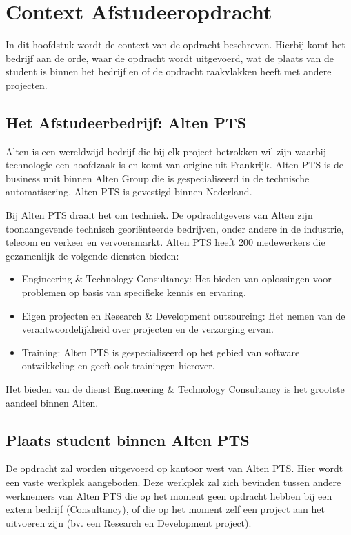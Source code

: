 \documentclass{../local}
\begin{document}
\section{Context Afstudeeropdracht}
In dit hoofdstuk wordt de context van de opdracht beschreven. Hierbij komt het bedrijf aan de orde, waar de opdracht wordt uitgevoerd, wat de plaats van de student is binnen het bedrijf en of de opdracht raakvlakken heeft met andere projecten. 

\subsection{Het Afstudeerbedrijf: Alten PTS}
Alten is een wereldwijd bedrijf die bij elk project betrokken wil zijn waarbij technologie een hoofdzaak is en komt van origine uit Frankrijk. Alten PTS is de business unit binnen Alten Group die is gespecialiseerd in de technische automatisering. Alten PTS is gevestigd binnen Nederland.

Bij Alten PTS draait het om techniek. De opdrachtgevers van Alten zijn toonaangevende technisch georiënteerde bedrijven, onder andere in de industrie, telecom en verkeer en vervoersmarkt. Alten PTS heeft 200 medewerkers die gezamenlijk de volgende diensten bieden:

\begin{itemize}

\item Engineering \& Technology Consultancy: Het bieden van oplossingen voor problemen op basis van specifieke kennis en ervaring.
\item Eigen projecten en Research \& Development outsourcing: Het nemen van de verantwoordelijkheid over projecten en de verzorging ervan.
\item Training: Alten PTS is gespecialiseerd op het gebied van software ontwikkeling en geeft ook trainingen hierover.

\end{itemize}

Het bieden van de dienst Engineering \& Technology Consultancy is het grootste aandeel binnen Alten.\cite{Alten}

\subsection{Plaats student binnen Alten PTS}
De opdracht zal worden uitgevoerd op kantoor west van Alten PTS. Hier wordt een vaste werkplek aangeboden. Deze werkplek zal zich bevinden tussen andere werknemers van Alten PTS die op het moment geen opdracht hebben bij een extern bedrijf (Consultancy), of die op het moment zelf een project aan het uitvoeren zijn (bv. een Research en Development project).
\end{document}
